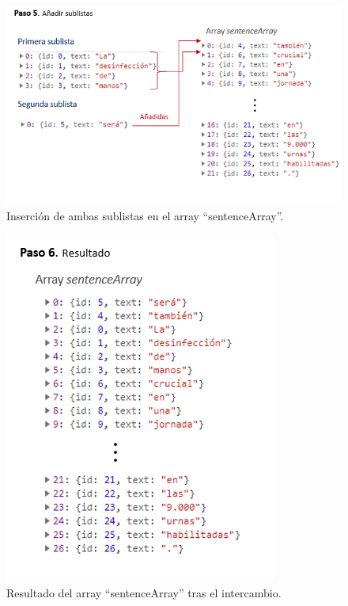 \begin{itemize}
\begin{itemize}
\begin{figure}[h!]
	
	\includegraphics[scale=1.1]{Imagenes/Figuras/IntercambioPaso5}
	
	
	\caption{Inserción de ambas sublistas en el array ``sentenceArray''.}
	\label{fig:paso5}
\end{figure}
	\begin{figure}[h!]
	\centering
	
	
	\includegraphics[scale=1.3]{Imagenes/Figuras/IntercambioPaso6}
	
	
	\caption{Resultado del array ``sentenceArray'' tras el intercambio.}
	\label{fig:paso6}
\end{figure}

		
	
	\end{itemize}


\end{itemize}
